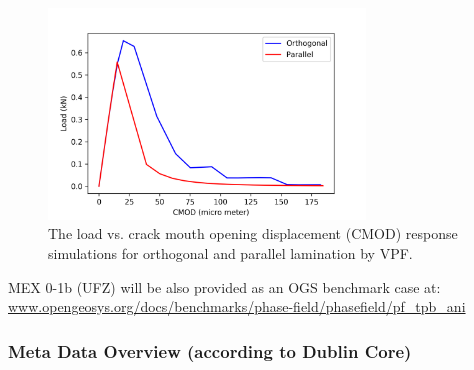 \begin{figure}[!ht]
\centering
\includegraphics[width=0.75\textwidth]{figures/VPF_ME1_ex_NF_CMOD.png}
\caption{The load vs. crack mouth opening displacement (CMOD) response simulations for orthogonal and parallel lamination by VPF.}
\label{fig:Keita_ME1_VPF_Claystone}
\end{figure}

MEX 0-1b (UFZ) will be also provided as an OGS benchmark case at:\\
\small
\url{www.opengeosys.org/docs/benchmarks/phase-field/phasefield/pf_tpb_ani}
\normalsize

\clearpage
\subsubsection*{Meta Data Overview (according to Dublin Core)}

